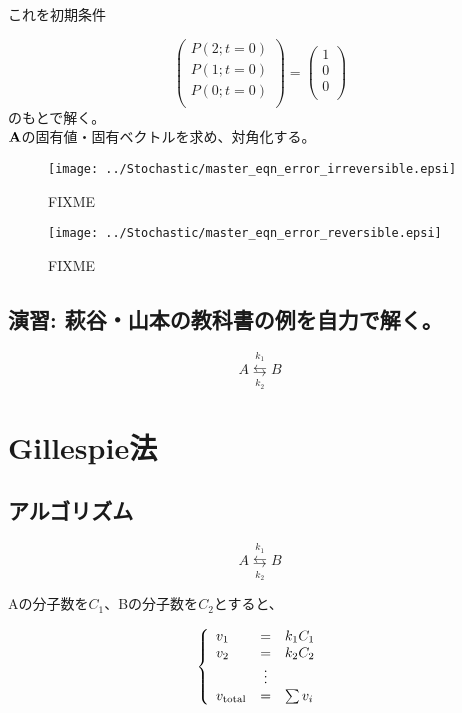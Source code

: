 これを初期条件

\[
\left(
\begin{array}{l}
P(2;t=0)\\
P(1;t=0)\\
P(0;t=0)\\
\end{array}
\right)
=
\left(
\begin{array}{l}
1\\
0\\
0\\
\end{array}
\right)
\]
のもとで解く。\\
\indent \({\bf A}\)の固有値・固有ベクトルを求め、対角化する。

\begin{figure}[ht]
\centering
\texttt{[image: ../Stochastic/master\_eqn\_error\_irreversible.epsi]}
\caption{FIXME}
\label{fig:stochastic2}
\end{figure}


\begin{figure}[ht]
\centering
\texttt{[image: ../Stochastic/master\_eqn\_error\_reversible.epsi]}
\caption{FIXME}
\label{fig:stochastic3}
\end{figure}


\subsection{演習: 萩谷・山本の教科書の例を自力で解く。}

\[A \overset{k_1}{\underset{k_2}\leftrightarrows} B\]

\section{Gillespie法}
\subsection{アルゴリズム}
\[A \overset{k_1}{\underset{k_2}\leftrightarrows} B\]

Aの分子数を$C_1$、Bの分子数を$C_2$とすると、

\[\left\{
\begin{array}{lcl}
v_1 & = & k_1 C_1 \\ 
v_2 & = & k_2 C_2 \\ 
    & \vdots & \\
v_{\rm total} & = & \sum v_i\\ 
\end{array}
\right.\]

